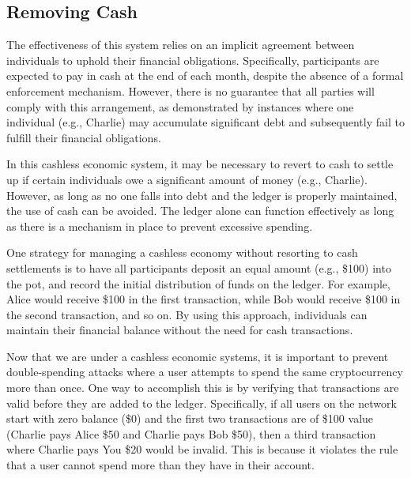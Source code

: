 \subsection{Removing Cash}
The effectiveness of this system relies on an implicit agreement between individuals to uphold their financial obligations. Specifically, participants are expected to pay in cash at the end of each month, despite the absence of a formal enforcement mechanism. However, there is no guarantee that all parties will comply with this arrangement, as demonstrated by instances where one individual (e.g., Charlie) may accumulate significant debt and subsequently fail to fulfill their financial obligations.

In this cashless economic system, it may be necessary to revert to cash to settle up if certain individuals owe a significant amount of money (e.g., Charlie). However, as long as no one falls into debt and the ledger is properly maintained, the use of cash can be avoided. The ledger alone can function effectively as long as there is a mechanism in place to prevent excessive spending.

One strategy for managing a cashless economy without resorting to cash settlements is to have all participants deposit an equal amount (e.g., \$100) into the pot, and record the initial distribution of funds on the ledger. For example, Alice would receive \$100 in the first transaction, while Bob would receive \$100 in the second transaction, and so on. By using this approach, individuals can maintain their financial balance without the need for cash transactions.

%

Now that we are under a cashless economic systems, it is important to prevent double-spending attacks where a user attempts to spend the same cryptocurrency more than once. One way to accomplish this is by verifying that transactions are valid before they are added to the ledger. Specifically, if all users on the network start with zero balance (\$0) and the first two transactions are of \$100 value (Charlie pays Alice \$50 and Charlie pays Bob \$50), then a third transaction where Charlie pays You \$20 would be invalid. This is because it violates the rule that a user cannot spend more than they have in their account.

%

